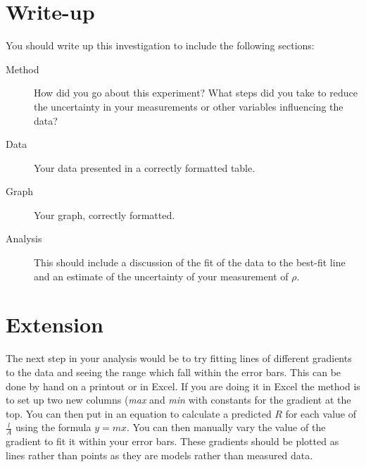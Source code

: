 \documentclass[11pt]{article}
\begin{document}
\begin{adjustwidth}{0cm}{0.4\textwidth}
\section{Write-up}
You should write up this investigation to include the following sections:
\begin{description}
    \item[Method] How did you go about this experiment?  What steps did you take to reduce the uncertainty in your measurements or other variables influencing the data?
    \item[Data] Your data presented in a correctly formatted table.
    \item[Graph] Your graph, correctly formatted.
    \item[Analysis] This should include a discussion of the fit of the data to the best-fit line and an estimate of the uncertainty of your measurement of $\rho$.
\end{description}

\section*{Extension}
The next step in your analysis would be to try fitting lines of different gradients to the data and seeing the range which fall within the error bars.  This can be done by hand on a printout or in Excel.  If you are doing it in Excel the method is to set up two new columns (\emph{max} and \emph{min} with constants for the gradient at the top.  You can then put in an equation to calculate a predicted $R$ for each value of $\frac{l}{A}$ using the formula $y=mx$.  You can then manually vary the value of the gradient to fit it within your error bars.  These gradients should be plotted as lines rather than points as they are models rather than measured data.


\end{adjustwidth}
\end{document}
